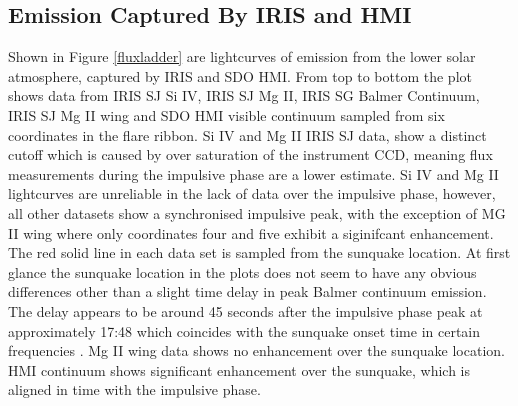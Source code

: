 \subsection{Emission Captured By IRIS and HMI}
Shown in Figure \ref{fluxladder} are lightcurves of emission from the lower solar atmosphere, captured by IRIS and SDO HMI. From top to bottom the plot shows data from IRIS SJ Si IV, IRIS SJ Mg II, IRIS SG Balmer Continuum, IRIS SJ Mg II wing and SDO HMI visible continuum sampled from six coordinates in the flare ribbon. Si IV and Mg II IRIS SJ data, show a distinct cutoff which is caused by over saturation of the instrument CCD, meaning flux measurements during the impulsive phase are a lower estimate. Si IV and Mg II lightcurves are unreliable in the lack of data over the impulsive phase, however, all other datasets show a synchronised impulsive peak, with the exception of MG II wing where only coordinates four and five exhibit a siginifcant enhancement. The red solid line in each data set is sampled from the sunquake location. At first glance the sunquake location in the plots does not seem to have any obvious differences other than a slight time delay in peak Balmer continuum emission. The delay appears to be around 45 seconds after the impulsive phase peak at approximately 17:48 which coincides with the sunquake onset time in certain frequencies \citep{2015ApJ...812...35M}. Mg II wing data shows no enhancement over the sunquake location. HMI continuum shows significant enhancement over the sunquake, which is aligned in time with the impulsive phase. 


